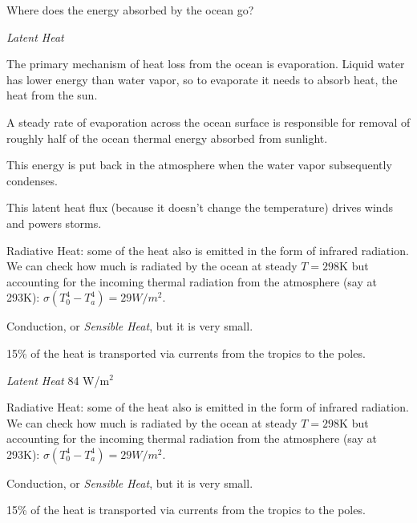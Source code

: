 \documentclass[11pt]{book}
\begin{document}
Where does the energy absorbed by the ocean go? 
\bei
\item {\it Latent Heat} 
\bee
\item The primary mechanism of heat loss from the ocean is evaporation. Liquid water has lower energy than water vapor, so to evaporate it needs to absorb heat, the heat from the sun. 
\item A steady rate of evaporation across the ocean surface is responsible for removal of roughly half of the ocean thermal energy absorbed from sunlight. 
\item This energy is put back in the atmosphere when the water vapor subsequently condenses. 
\item This latent heat flux (because it doesn't change the temperature) drives winds and powers storms.
\eee
\item Radiative Heat: some of the heat also is emitted in the form of infrared radiation. We can check how much is radiated by the ocean at steady $T=298$K but accounting for the incoming thermal radiation from the atmosphere (say at 293K): $\sigma (T_0^4-T_a^4)= 29W/m^2$.
\item Conduction, or {\it Sensible Heat}, but it is very small.
\item 15\% of the heat is transported via currents from the tropics to the poles.
\eei

\bei
\item {\it Latent Heat} 84 W/m$^2$
\item Radiative Heat: some of the heat also is emitted in the form of infrared radiation. We can check how much is radiated by the ocean at steady $T=298$K but accounting for the incoming thermal radiation from the atmosphere (say at 293K): $\sigma (T_0^4-T_a^4)= 29W/m^2$.
\item Conduction, or {\it Sensible Heat}, but it is very small.
\item 15\% of the heat is transported via currents from the tropics to the poles.
\eei
\end{document}
